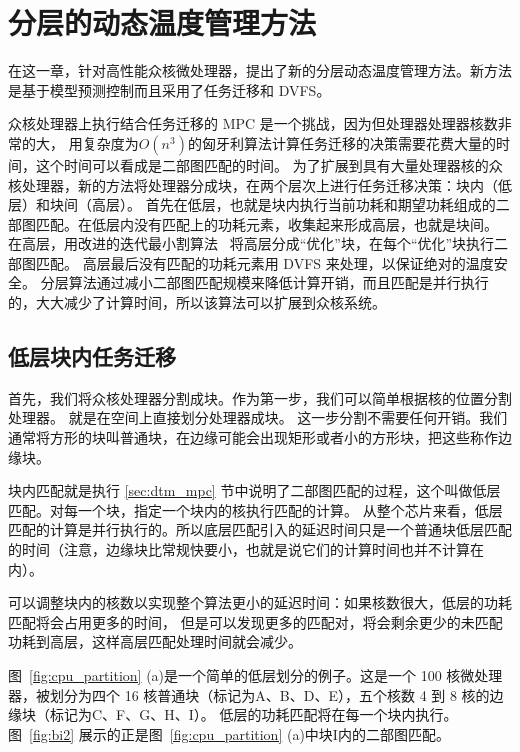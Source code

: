 
\chapter{分层的动态温度管理方法}\label{sec:new_method}

在这一章，针对高性能众核微处理器，提出了新的分层动态温度管理方法。新方法是基于模型预测控制而且采用了任务迁移和 DVFS。

众核处理器上执行结合任务迁移的 MPC 是一个挑战，因为但处理器处理器核数非常的大，
用复杂度为$O(n^{3})$的匈牙利算法计算任务迁移的决策需要花费大量的时间，这个时间可以看成是二部图匹配的时间。
为了扩展到具有大量处理器核的众核处理器，新的方法将处理器分成块，在两个层次上进行任务迁移决策：块内（低层）和块间（高层）。
首先在低层，也就是块内执行当前功耗和期望功耗组成的二部图匹配。在低层内没有匹配上的功耗元素，收集起来形成高层，也就是块间。
在高层，用改进的迭代最小割算法~\cite{Fidducia:DAC'82}  将高层分成“优化”块，在每个“优化”块执行二部图匹配。
高层最后没有匹配的功耗元素用 DVFS 来处理，以保证绝对的温度安全。
分层算法通过减小二部图匹配规模来降低计算开销，而且匹配是并行执行的，大大减少了计算时间，所以该算法可以扩展到众核系统。

\section{低层块内任务迁移}\label{sec:parts}

首先，我们将众核处理器分割成块。作为第一步，我们可以简单根据核的位置分割处理器。
就是在空间上直接划分处理器成块。
这一步分割不需要任何开销。我们通常将方形的块叫普通块，在边缘可能会出现矩形或者小的方形块，把这些称作边缘块。

块内匹配就是执行 \ref{sec:dtm_mpc} 节中说明了二部图匹配的过程，这个叫做低层匹配。对每一个块，指定一个块内的核执行匹配的计算。
从整个芯片来看，低层匹配的计算是并行执行的。所以底层匹配引入的延迟时间只是一个普通块低层匹配的时间（注意，边缘块比常规快要小，也就是说它们的计算时间也并不计算在内）。

可以调整块内的核数以实现整个算法更小的延迟时间：如果核数很大，低层的功耗匹配将会占用更多的时间，
但是可以发现更多的匹配对，将会剩余更少的未匹配功耗到高层，这样高层匹配处理时间就会减少。

图~\ref{fig:cpu_partition} (a)是一个简单的低层划分的例子。这是一个 100 核微处理器，被划分为四个 16 核普通块（标记为A、B、D、E），五个核数 4 到 8 核的边缘块（标记为C、F、G、H、I）。
低层的功耗匹配将在每一个块内执行。图~\ref{fig:bi2} 展示的正是图~\ref{fig:cpu_partition} (a)中块I内的二部图匹配。

